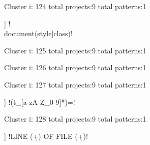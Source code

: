 Cluster i: 124
total projects:9
total patterns:1
\begin{multicols}{1}
\begin{description}[noitemsep,topsep=0pt]
\item [[9] ] \cverb!\\document(style|class)!
\end{description}
\end{multicols}







Cluster i: 125
total projects:9
total patterns:1
\begin{multicols}{1}
\end{multicols}







Cluster i: 126
total projects:9
total patterns:1
\begin{multicols}{1}
\end{multicols}







Cluster i: 127
total projects:9
total patterns:1
\begin{multicols}{1}
\begin{description}[noitemsep,topsep=0pt]
\item [[9] ] \cverb!\s*(t_[a-zA-Z_0-9]*)\s*=!
\end{description}
\end{multicols}







Cluster i: 128
total projects:9
total patterns:1
\begin{multicols}{1}
\begin{description}[noitemsep,topsep=0pt]
\item [[9] ] \cverb!LINE (\d+) OF FILE (\d+)!
\end{description}
\end{multicols}







